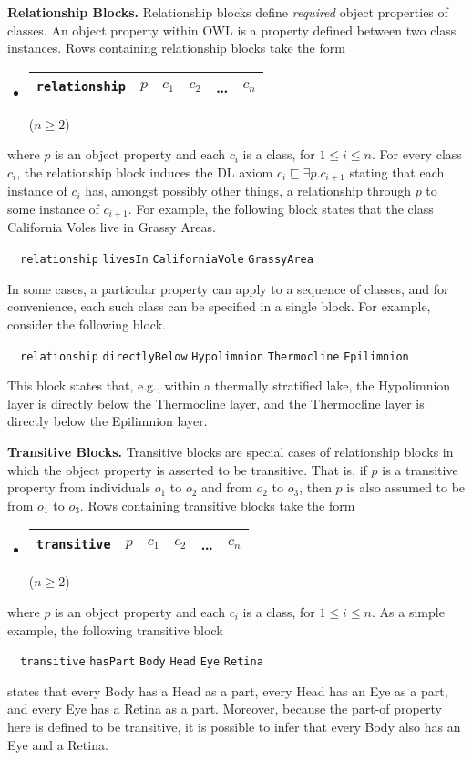 \documentclass[preprint,number]{elsarticle}
\newcommand{\myblock}[1]{\vspace{12pt}\noindent\textbf{#1}}
\begin{document}
\myblock{Relationship Blocks.} Relationship blocks define
\emph{required} object properties of classes. An object property
within OWL is a property defined between two class instances. Rows
containing relationship blocks take the form
\begin{itemize}
\item[]
  \begin{tabular}{|l|l|l|l|l|l|}\hline \texttt{relationship} & $p$ & $c_1$
    & $c_2$ & \dots & $c_n$ \\ \hline
  \end{tabular} \hfill ($n \ge 2$)
\end{itemize}
where $p$ is an object property and each $c_i$ is a class, for $1 \le
i \le n$.  For every class $c_i$, the relationship block induces the
DL axiom $c_i \sqsubseteq \exists p . c_{i+1}$ stating that each
instance of $c_i$ has, amongst possibly other things, a relationship
through $p$ to some instance of $c_{i+1}$.  For example, the following
block states that the class California Voles live in Grassy Areas.
\begin{tabbing}
  ~~\texttt{relationship} \texttt{livesIn} \texttt{CaliforniaVole} 
    \texttt{GrassyArea}
\end{tabbing}
In some cases, a particular property can apply to a sequence of
classes, and for convenience, each such class can be specified in a
single block. For example, consider the following block.
\begin{tabbing}
  ~~\texttt{relationship} \texttt{directlyBelow} \texttt{Hypolimnion} 
    \texttt{Thermocline} \texttt{Epilimnion} 
\end{tabbing}
This block states that, e.g., within a thermally stratified lake, the
Hypolimnion layer is directly below the Thermocline layer, and the
Thermocline layer is directly below the Epilimnion layer. 

\myblock{Transitive Blocks.} Transitive blocks are special cases of
relationship blocks in which the object property is asserted to be
transitive. That is, if $p$ is a transitive property from individuals
$o_1$ to $o_2$ and from $o_2$ to $o_3$, then $p$ is also assumed to be
from $o_1$ to $o_3$. Rows containing transitive blocks take the form
\begin{itemize}
\item[]
  \begin{tabular}{|l|l|l|l|l|l|}\hline \texttt{transitive} & $p$ & $c_1$
    & $c_2$ & \dots & $c_n$ \\ \hline
  \end{tabular} \hfill ($n \ge 2$)
\end{itemize}
where $p$ is an object property and each $c_i$ is a class, for $1 \le
i \le n$. As a simple example, the following transitive block
\begin{tabbing}
  ~~\texttt{transitive} \texttt{hasPart} \texttt{Body}
  \texttt{Head} \texttt{Eye} \texttt{Retina}
\end{tabbing} 
states that every Body has a Head as a part, every Head has an Eye as
a part, and every Eye has a Retina as a part. Moreover, because the
part-of property here is defined to be transitive, it is possible to
infer that every Body also has an Eye and a Retina.
\end{document}
